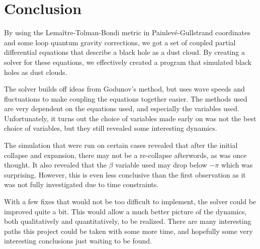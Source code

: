 \documentclass[12pt]{article}
\begin{document}
\section{Conclusion}

By using the Lema\^{i}tre-Tolman-Bondi metric in Painlev\'{e}-Gullstrand coordinates and
some loop quantum gravity corrections, we got a set of coupled partial differential
equations that describe a black hole as a dust cloud. By creating a solver for these
equations, we effectively created a program that simulated black holes as dust clouds.

The solver builds off ideas from Godunov's method, but uses wave speeds and fluctuations
to make coupling the equations together easier. The methods used are very dependent on
the equations used, and especially the variables used. Unfortunately, it turns out the
choice of variables made early on was not the best choice of variables, but they still
revealed some interesting dynamics.

The simulation that were run on certain cases revealed that after the initial collapse
and expansion, there may not be a re-collapse afterwords, as was once thought. It also
revealed that the $\beta$ variable used may drop below $-\pi$ which was surprising.
However, this is even less conclusive than the first observation as it was not fully
investigated due to time constraints.

With a few fixes that would not be too difficult to implement, the solver could be
improved quite a bit. This would allow a much better picture of the dynamics, both
qualitatively and quantitatively, to be realized. There are many interesting paths this
project could be taken with some more time, and hopefully some very interesting
conclusions just waiting to be found.

\printbibliography[heading=bibintoc]
\end{document}
